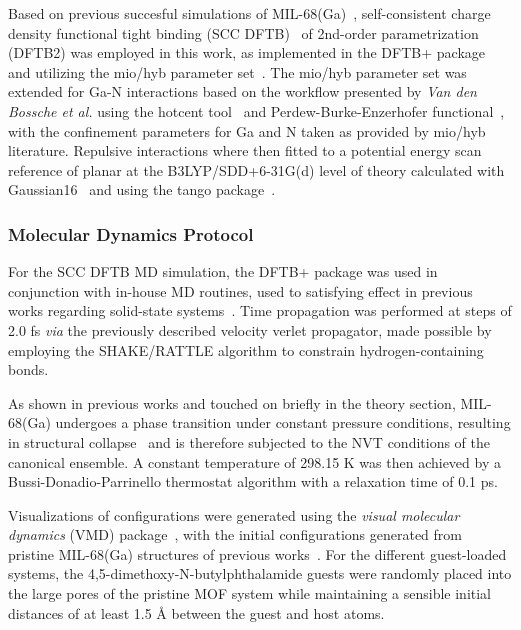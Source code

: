 \documentclass[11pt]{article}
\begin{document}
Based on previous succesful simulations of MIL-68(Ga)~\cite{Fischereder2023,Purtscher2023,Hofer2023}, self-consistent charge density functional tight binding (SCC DFTB)~\cite{Oliveira2009} of 2nd-order parametrization (DFTB2) was employed in this work, as implemented in the DFTB+ package~\cite{Hourahine2020} and utilizing the mio/hyb parameter set~\cite{Elstner1998, Yang2008, Szcs2004,SzuxBcs2003}. The mio/hyb parameter set was extended for Ga-N interactions based on the workflow presented by \textit{Van den Bossche et al.} using the hotcent tool~\cite{VandenBossche2024,VandenBossche2019} and Perdew-Burke-Enzerhofer functional~\cite{Perdew1996}, with the confinement parameters for Ga and N taken as provided by mio/hyb literature. Repulsive interactions where then fitted to a potential energy scan reference of planar  at the B3LYP/SDD+6-31G(d) level of theory calculated with Gaussian16~\cite{Ditchfield1971-lb,Becke1993-qq,Hariharan1973-nu,Hehre1972-vi,Rassolov2001-or,Bergner1993-ua} and using the tango package~\cite{VandenBossche2018}.

\subsubsection{Molecular Dynamics Protocol}\label{setup}
For the SCC DFTB MD simulation, the DFTB+ package was used in conjunction with in-house MD routines, used to satisfying effect in previous works regarding solid-state systems~\cite{Hofer2015-wy,Saleh2019-yz,Prasetyo2019-eh}. Time propagation was performed at steps of 2.0 fs \textit{via} the previously described velocity verlet propagator, made possible by employing the SHAKE/RATTLE algorithm to constrain hydrogen-containing bonds.
\\ \par \noindent As shown in previous works and touched on briefly in the theory section, MIL-68(Ga) undergoes a phase transition under constant pressure conditions, resulting in structural collapse~\cite{Purtscher2023,Fischereder2023} and is therefore subjected to the NVT conditions of the canonical ensemble. A constant temperature of 298.15 K was then achieved by a Bussi-Donadio-Parrinello thermostat algorithm with a relaxation time of 0.1 ps.
\\ \par \noindent Visualizations of configurations were generated using the \textit{visual molecular dynamics} (VMD) package~\cite{Humphrey1996}, with the initial configurations generated from pristine MIL-68(Ga) structures of previous works~\cite{Fischereder2023}. For the different guest-loaded systems, the 4,5-dimethoxy-N-butylphthalamide guests were randomly placed into the large pores of the pristine MOF system while maintaining a sensible initial distances of at least 1.5 Å between the guest and host atoms.
\end{document}
